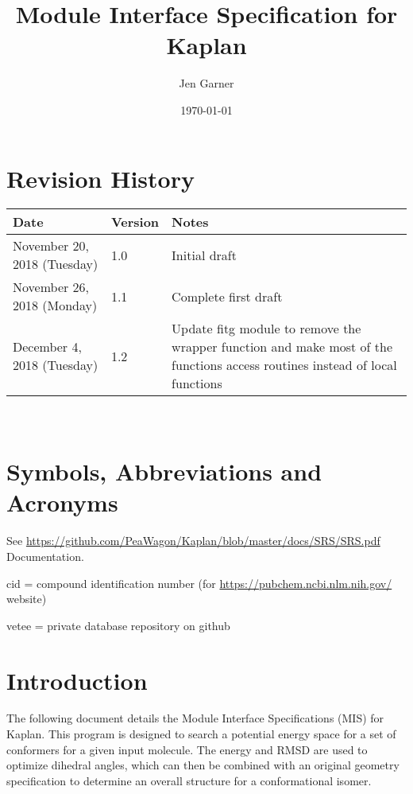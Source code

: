 \documentclass[12pt, titlepage]{article}
\newcommand{\progname}{Kaplan}
\begin{document}
\title{Module Interface Specification for \progname{}}

\author{Jen Garner}

\date{\today}

\maketitle


\section{Revision History}

\begin{tabularx}{\textwidth}{p{3cm}p{2cm}X}
\toprule {\bf Date} & {\bf Version} & {\bf Notes}\\
\midrule
November 20, 2018 (Tuesday) & 1.0 & Initial draft \\
November 26, 2018 (Monday) & 1.1 & Complete first draft \\
December 4, 2018 (Tuesday) & 1.2 & Update fitg module to remove the wrapper 
function and make most of the functions access routines instead of local 
functions \\
\bottomrule
\end{tabularx}

~\newpage

\section{Symbols, Abbreviations and Acronyms}

See \href{SRS}{https://github.com/PeaWagon/Kaplan/blob/master/docs/SRS/SRS.pdf} 
Documentation.

cid = compound identification number (for 
\href{pubchem}{https://pubchem.ncbi.nlm.nih.gov/} website)

vetee = private database repository on github

\newpage

\tableofcontents

\newpage


\section{Introduction}

The following document details the Module Interface Specifications (MIS) for 
\progname{}. This program is designed to search a potential energy space for a 
set of conformers for a given input molecule. The energy and RMSD are used to 
optimize dihedral angles, which can then be combined with an original geometry 
specification to determine an overall structure for a conformational isomer.
\end{document}
